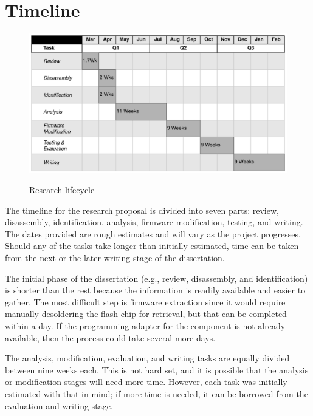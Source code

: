 \chapter{\leavevmode Timeline}
\label{chap:timeline}

\begin{figure}[!htb]%
  \centering
  {\includegraphics[width=160mm,scale=1]{Figures/timeline_gantt.drawio.png}}
  \caption{Research lifecycle}%
  \label{fig:research_lifecycle}%
\end{figure}

The timeline for the research proposal is divided into seven parts: review, disassembly, identification, analysis, firmware modification, testing, and writing. The dates provided are rough estimates and will vary as the project progresses. Should any of the tasks take longer than initially estimated, time can be taken from the next or the later writing stage of the dissertation.

The initial phase of the dissertation (e.g., review, disassembly, and identification) is shorter than the rest because the information is readily available and easier to gather. The most difficult step is firmware extraction since it would require manually desoldering the flash chip for retrieval, but that can be completed within a day. If the programming adapter for the component is not already available, then the process could take several more days.

The analysis, modification, evaluation, and writing tasks are equally divided between nine weeks each. This is not hard set, and it is possible that the analysis or modification stages will need more time. However, each task was initially estimated with that in mind; if more time is needed, it can be borrowed from the evaluation and writing stage.

